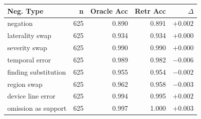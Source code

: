 \begin{tabular}{lrrrr}
\toprule
Neg. Type & n & Oracle Acc & Retr Acc & $\Delta$ \\
\midrule
negation & 625 & 0.890 & 0.891 & $+0.002$ \\
laterality swap & 625 & 0.934 & 0.934 & $+0.000$ \\
severity swap & 625 & 0.990 & 0.990 & $+0.000$ \\
temporal error & 625 & 0.989 & 0.982 & $-0.006$ \\
finding substitution & 625 & 0.955 & 0.954 & $-0.002$ \\
region swap & 625 & 0.962 & 0.958 & $-0.003$ \\
device line error & 625 & 0.994 & 0.995 & $+0.002$ \\
omission as support & 625 & 0.997 & 1.000 & $+0.003$ \\
\bottomrule
\end{tabular}